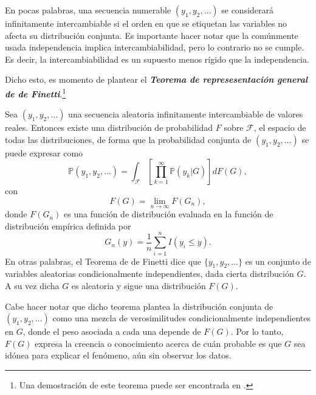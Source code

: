 En pocas palabras, una secuencia numerable $(y_1,y_2,\ldots)$ se considerar\'a infinitamente intercambiable si el orden en que se etiquetan las variables no afecta su distribuci\'on conjunta. Es importante hacer notar que la com\'unmente usada independencia implica intercambiabilidad, pero lo contrario no se cumple. Es decir, la intercambiabilidad es un supuesto menos r\'igido que la independencia.

Dicho esto, es momento de plantear el \textbf{\textit{Teorema de represesentaci\'on general de de Finetti}}.\footnote{Una demostraci\'on de este teorema puede ser encontrada en \cite{Schervish_TheoryStats}.}

\begin{theorem*}
    Sea $(y_1,y_2,\ldots)$ una secuencia aleatoria infinitamente intercambiable de valores reales. Entonces existe una distribuci\'on de probabilidad $F$ sobre $\mathcal{F}$, el espacio de todas las distribuciones, de forma que la probabilidad conjunta de $(y_1,y_2,\ldots)$ se puede expresar como
    \begin{equation*}
        \mathbb{P}(y_1,y_2,\ldots) =
        \int_{\mathcal{F}}\left[\prod_{k=1}^\infty \mathbb{P}(y_k|G)\right]dF(G),
    \end{equation*}
    con
    \begin{equation*}
        F(G) = \lim_{n \to \infty} F(G_n),
    \end{equation*}
    donde $F(G_n)$ es una funci\'on de distribuci\'on evaluada en la funci\'on de distribuci\'on emp\'irica definida por
    \begin{equation*}
        G_n(y) = \frac{1}{n} \sum_{i=1}^n I(y_i \leq y).
    \end{equation*}
    En otras palabras, el Teorema de de Finetti dice que $\{y_1,y_2,\ldots\}$ es un conjunto de variables aleatorias condicionalmente independientes, dada cierta distribuci\'on $G$. A su vez dicha $G$ es aleatoria y sigue una distribuci\'on $F(G)$.
\end{theorem*}

Cabe hacer notar que dicho teorema plantea la distribuci\'on conjunta de $(y_1,y_2,\ldots)$ como una mezcla de verosimilitudes condicionalmente independientes en $G$, donde el peso asociada a cada una depende de $F(G)$. Por lo tanto, $F(G)$ expresa la creencia o conocimiento acerca de cu\'an probable es que $G$ sea id\'onea para explicar el fen\'omeno, a\'un sin observar los datos.

